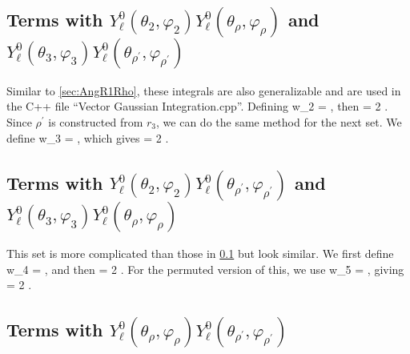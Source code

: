 \documentclass[Dissertation.tex]{subfiles}
\begin{document}
\subsection{Terms with \texorpdfstring{$Y_\ell^0(\theta_2, \varphi_2) Y_\ell^0(\theta_{\rho}, \varphi_{\rho})$}{Y2-Yrho} and \texorpdfstring{$Y_\ell^0(\theta_3, \varphi_3) Y_\ell^0(\theta_{\rho^\prime}, \varphi_{\rho^\prime})$}{Y3-Yrho'}}
\label{sec:AngR2Rho}

Similar to \cref{sec:AngR1Rho}, these integrals are also generalizable and are used in the C++ file ``Vector Gaussian Integration.cpp''. Defining
\beq
w_2 = ,
\eeq
then
\beq
{} = 2 \pi {}.
\eeq
Since $\rho^\prime$ is constructed from $r_3$, we can do the same method for the next set. We define
\beq
w_3 = ,
\eeq
which gives
\beq
{} = 2 \pi {}.
\eeq


\subsection{Terms with \texorpdfstring{$Y_\ell^0(\theta_2, \varphi_2) Y_\ell^0(\theta_{\rho^\prime}, \varphi_{\rho^\prime})$}{Y2-Yrho'} and \texorpdfstring{$Y_\ell^0(\theta_3, \varphi_3) Y_\ell^0(\theta_{\rho}, \varphi_{\rho})$}{Y3-Yrho}}
\label{sec:AngR2Rhop}

This set is more complicated than those in \cref{sec:AngR2Rho} but look similar. We first define
\beq
w_4 = ,
\eeq
and then
\beq
{} = 2 \pi {}.
\eeq
For the permuted version of this, we use
\beq
w_5 = ,
\eeq
giving
\beq
{} = 2 \pi {}.
\eeq
{}


\subsection{Terms with \texorpdfstring{$Y_\ell^0(\theta_\rho, \varphi_\rho) Y_\ell^0(\theta_{\rho^\prime}, \varphi_{\rho^\prime})$}{Yrho-Yrho'}}
\end{document}
